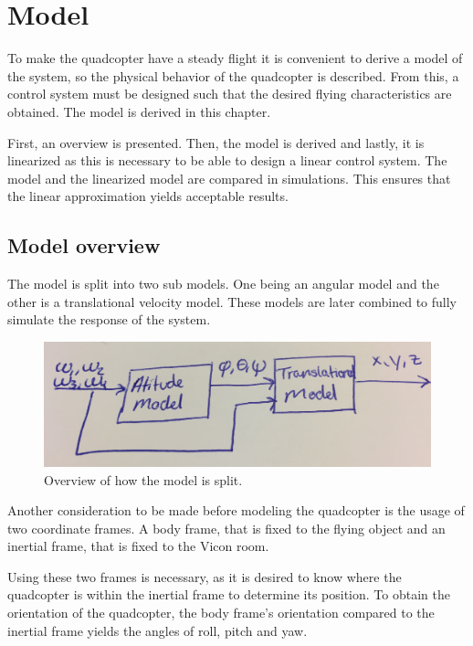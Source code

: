 \chapter{Model}
To make the quadcopter have a steady flight it is convenient to derive a model of the system, so the physical behavior of the quadcopter is described. From this, a control system must be designed such that the desired flying characteristics are obtained. The model is derived in this chapter.

First, an overview is presented. Then, the model is derived and lastly, it is linearized as this is necessary to be able to design a linear control system. The model and the linearized model are compared in simulations. This ensures that the linear approximation yields acceptable results.

\section{Model overview}
The model is split into two sub models. One being an angular model and the other is a translational velocity model. These models are later combined to fully simulate the response of the system.
\begin{figure}[H]
\centering
\includegraphics[scale=0.1]{figures/modeloverview.PNG}
\caption{Overview of how the model is split.}
\label{sss}
\end{figure}
Another consideration to be made before modeling the quadcopter is the usage of two coordinate frames. A body frame, that is fixed to the flying object and an inertial frame, that is fixed to the Vicon room. 

Using these two frames is necessary, as it is desired to know where the quadcopter is within the inertial frame to determine its position. To obtain the orientation of the quadcopter, the body frame's orientation compared to the inertial frame yields the angles of roll, pitch and yaw. 

